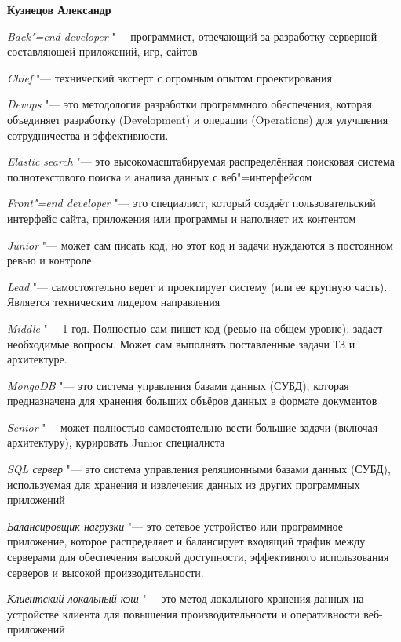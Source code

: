 \documentclass{article}
\begin{document}
\begin{center}
    \textbf{Кузнецов Александр}
\end{center}

\textit{Back"=end developer} "--- программист, отвечающий за разработку серверной составляющей приложений, игр, сайтов

\textit{Chief} "--- технический эксперт с огромным опытом проектирования

\textit{Devops} "--- это методология разработки программного обеспечения, которая объединяет разработку (Development) и операции (Operations) для улучшения сотрудничества и эффективности.

\textit{Elastic search} "--- это высокомасштабируемая распределённая поисковая система полнотекстового поиска и анализа данных с веб"=интерфейсом

\textit{Front"=end developer} "--- это специалист, который создаёт пользовательский интерфейс сайта, приложения или программы и наполняет их контентом

\textit{Junior} "--- может сам писать код, но этот код и задачи нуждаются в постоянном ревью и контроле

\textit{Lead} "--- самостоятельно ведет и проектирует систему (или ее крупную часть). Является техническим лидером направления

\textit{Middle} "--- 1 год. Полностью сам пишет код (ревью на общем уровне), задает необходимые вопросы. Может сам выполнять поставленные задачи ТЗ и архитектуре.

\textit{MongoDB} "--- это система управления базами данных (СУБД), которая предназначена для хранения больших объёров данных в формате документов

\textit{Senior} "--- может полностью самостоятельно вести большие задачи (включая архитектуру), курировать Junior специалиста

\textit{SQL сервер} "--- это система управления реляционными базами данных (СУБД), используемая для хранения и извлечения данных из других программных приложений

\textit{Балансировщик нагрузки} "--- это сетевое устройство или программное приложение, которое распределяет и балансирует входящий трафик между серверами для обеспечения высокой доступности, эффективного использования серверов и высокой производительности.

\textit{Клиентский локальный кэш} "--- это метод локального хранения данных на устройстве клиента для повышения производительности и оперативности веб-приложений
\end{document}
